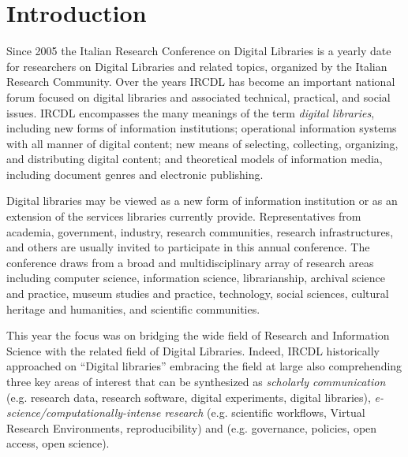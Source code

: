 \documentclass[sigconf, nonacm]{acmart}
\begin{document}


\maketitle

\section{Introduction}
Since 2005 the Italian Research Conference on Digital Libraries is a yearly date for researchers on Digital Libraries and related topics, organized by the Italian Research Community. Over the years IRCDL has become an important national forum focused on digital libraries and associated technical, practical, and social issues. IRCDL encompasses the many meanings of the term \emph{digital libraries}, including new forms of information institutions; operational information systems with all manner of digital content; new means of selecting, collecting, organizing, and distributing digital content; and theoretical models of information media, including document genres and electronic publishing. 

Digital libraries may be viewed as a new form of information institution or as an extension of the services libraries currently provide. Representatives from academia, government, industry, research communities, research infrastructures, and others are usually invited to participate in this annual conference. The conference draws from a broad and multidisciplinary array of research areas including computer science, information science, librarianship, archival science and practice, museum studies and practice, technology, social sciences, cultural heritage and humanities, and scientific communities. 

This year the focus was on bridging the wide field of Research and Information Science with the related field of Digital Libraries. Indeed, IRCDL historically approached on ``Digital libraries'' embracing the field at large also comprehending three key areas of interest that can be synthesized as \emph{scholarly communication} (e.g. research data, research software, digital experiments, digital libraries), \emph{e-science/computationally-intense research} (e.g. scientific workflows, Virtual Research Environments, reproducibility) and  (e.g. governance, policies, open access, open science).
\end{document}
